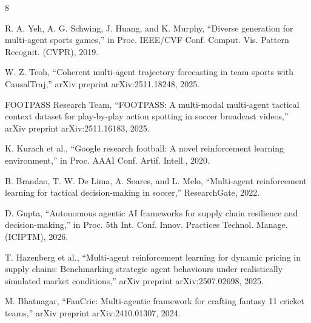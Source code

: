 \begin{thebibliography}{8}

R. A. Yeh, A. G. Schwing, J. Huang, and K. Murphy, ``Diverse generation for multi-agent sports games,'' in Proc. IEEE/CVF Conf. Comput. Vis. Pattern Recognit. (CVPR), 2019.

W. Z. Teoh, ``Coherent multi-agent trajectory forecasting in team sports with CausalTraj,'' arXiv preprint arXiv:2511.18248, 2025.

FOOTPASS Research Team, ``FOOTPASS: A multi-modal multi-agent tactical context dataset for play-by-play action spotting in soccer broadcast videos,'' arXiv preprint arXiv:2511.16183, 2025.

K. Kurach et al., ``Google research football: A novel reinforcement learning environment,'' in Proc. AAAI Conf. Artif. Intell., 2020.

B. Brandao, T. W. De Lima, A. Soares, and L. Melo, ``Multi-agent reinforcement learning for tactical decision-making in soccer,'' ResearchGate, 2022.

D. Gupta, ``Autonomous agentic AI frameworks for supply chain resilience and decision-making,'' in Proc. 5th Int. Conf. Innov. Practices Technol. Manage. (ICIPTM), 2026.

T. Hazenberg et al., ``Multi-agent reinforcement learning for dynamic pricing in supply chains: Benchmarking strategic agent behaviours under realistically simulated market conditions,'' arXiv preprint arXiv:2507.02698, 2025.

M. Bhatnagar, ``FanCric: Multi-agentic framework for crafting fantasy 11 cricket teams,'' arXiv preprint arXiv:2410.01307, 2024.

\end{thebibliography}